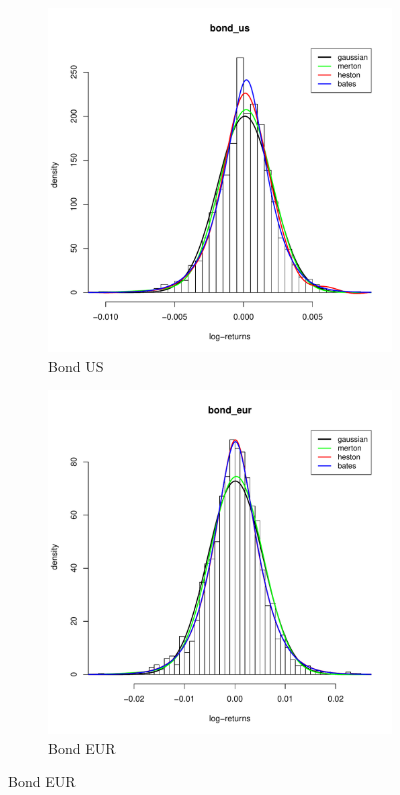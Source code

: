 \begin{figure}
\begin{subfigure}{0.44\textwidth}
	\centering
	\includegraphics[width=\linewidth]{Images/hist_bond_us.pdf}
	\caption{Bond US}
\end{subfigure}
\begin{subfigure}{0.44\textwidth}
	\centering
	\includegraphics[width=\linewidth]{Images/hist_bond_eur.pdf}
	\caption{Bond EUR}
\end{subfigure}


\end{figure}
